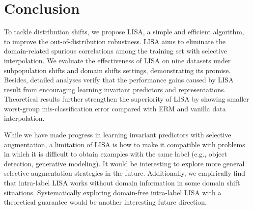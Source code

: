 \section{Conclusion}
To tackle distribution shifts, we propose LISA, a simple and efficient algorithm, to improve the out-of-distribution robustness. LISA aims to eliminate the domain-related spurious correlations among the training set with selective interpolation. We evaluate the effectiveness of LISA on nine datasets under subpopulation shifts and domain shifts settings, demonstrating its promise. Besides, detailed analyses verify that the performance gains caused by LISA result from encouraging learning invariant predictors and representations. Theoretical results further strengthen the superiority of LISA by showing smaller worst-group mis-classification error compared with ERM and vanilla data interpolation. 

While we have made progress in learning invariant predictors with selective augmentation, a limitation of LISA is how to make it compatible with problems in which it is difficult to obtain examples with the same label (e.g., object detection, generative modeling). It would be interesting to explore more general selective augmentation strategies in the future. Additionally, we empirically find that intra-label LISA works without domain information in some domain shift situations. Systematically exploring domain-free intra-label LISA with a theoretical guarantee would be another interesting future direction. 
